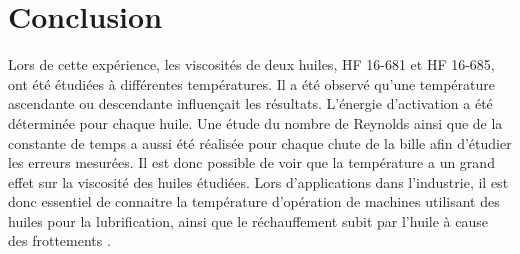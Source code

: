 \section{Conclusion}

Lors de cette expérience, les viscosités de deux huiles, HF 16-681 et HF 16-685, ont été étudiées à différentes températures. Il a été observé qu'une température ascendante ou descendante influençait les résultats. L'énergie d'activation a été déterminée pour chaque huile. Une étude du nombre de Reynolds ainsi que de la constante de temps a aussi été réalisée pour chaque chute de la bille afin d'étudier les erreurs mesurées. Il est donc possible de voir que la température a un grand effet sur la viscosité des huiles étudiées. Lors d'applications dans l'industrie, il est donc essentiel de connaitre la température d'opération de machines utilisant des huiles pour la lubrification, ainsi que le réchauffement subit par l'huile à cause des frottements \cite{lubrifiant_uwu}.
